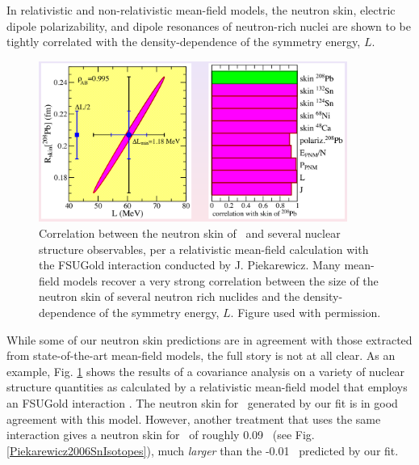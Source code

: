 In relativistic and non-relativistic mean-field models, the neutron skin,
electric dipole polarizability, and dipole resonances of neutron-rich nuclei are
shown to be tightly correlated with the density-dependence of the symmetry
energy, $L$.
\begin{figure}[tb]
    \centering
    \includegraphics[width=0.9\textwidth]{figures/PiekarewiczPb208SkinCorrelation.png}
    \caption[Correlation between the neutron skin of \pbEight\ and several nuclear structure
    observables]
    {
        Correlation between the neutron skin of \pbEight\ and several nuclear structure observables,
        per a relativistic mean-field calculation with the FSUGold interaction
        conducted by J. Piekarewicz. Many
        mean-field models recover a very strong correlation between the size of the
        neutron skin of several neutron rich nuclides and the density-dependence of the symmetry
        energy, $L$. Figure used with permission.
    }
    \label{PiekarewiczPb208SkinCorrelation}
\end{figure}
While some of our neutron skin predictions are in agreement with those extracted
from state-of-the-art mean-field models, the full story is not at all clear.
As an example, Fig. \ref{PiekarewiczPb208SkinCorrelation}
shows the results of a covariance analysis on a variety of nuclear structure
quantities as calculated by a relativistic mean-field model 
that employs an FSUGold interaction \cite{Fattoyev2012}. The neutron
skin for \pbEight\ generated by our fit is in good agreement with this model.
However, another treatment that uses the same interaction
\cite{Piekarewicz2006} gives a neutron skin for \snTwelve\ of roughly 0.09
\femto\meter\ (see Fig. \ref{Piekarewicz2006SnIsotopes}), much \textit{larger} than the
-0.01 \femto\meter\ predicted by our fit.
